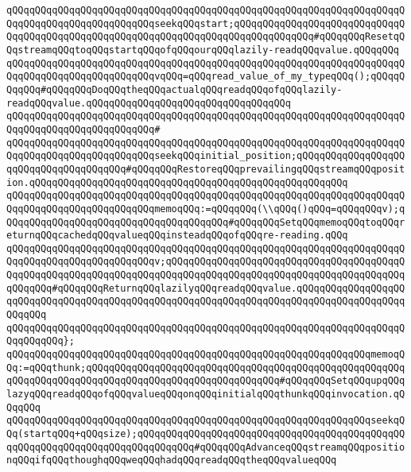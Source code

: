 \verb|qQQqqQQqqQQqqQQqqQQqqQQqqQQqqQQqqQQqqQQqqQQqqQQqqQQqqQQqqQQqqQQqqQQqqQQqqQQqqQQqqQQqqQQqqQQqqQQqseekqQQqstart;qQQqqQQqqQQqqQQqqQQqqQQqqQQqqQQqqQQqqQQqqQQqqQQqqQQqqQQqqQQqqQQqqQQqqQQqqQQqqQQqqQQq#qQQqqQQqResetqQQqstreamqQQqtoqQQqstartqQQqofqQQqourqQQqlazily-readqQQqvalue.qQQqqQQq|\newline
\verb|qQQqqQQqqQQqqQQqqQQqqQQqqQQqqQQqqQQqqQQqqQQqqQQqqQQqqQQqqQQqqQQqqQQqqQQqqQQqqQQqqQQqqQQqqQQqqQQqvqQQq=qQQqread_value_of_my_typeqQQq();qQQqqQQqqQQq#qQQqqQQqDoqQQqtheqQQqactualqQQqreadqQQqofqQQqlazily-readqQQqvalue.qQQqqQQqqQQqqQQqqQQqqQQqqQQqqQQqqQQq|\newline
\verb|qQQqqQQqqQQqqQQqqQQqqQQqqQQqqQQqqQQqqQQqqQQqqQQqqQQqqQQqqQQqqQQqqQQqqQQqqQQqqQQqqQQqqQQqqQQqqQQq#|\newline
\verb|qQQqqQQqqQQqqQQqqQQqqQQqqQQqqQQqqQQqqQQqqQQqqQQqqQQqqQQqqQQqqQQqqQQqqQQqqQQqqQQqqQQqqQQqqQQqqQQqseekqQQqinitial_position;qQQqqQQqqQQqqQQqqQQqqQQqqQQqqQQqqQQqqQQq#qQQqqQQqRestoreqQQqprevailingqQQqstreamqQQqposition.qQQqqQQqqQQqqQQqqQQqqQQqqQQqqQQqqQQqqQQqqQQqqQQqqQQqqQQq|\newline
\verb|qQQqqQQqqQQqqQQqqQQqqQQqqQQqqQQqqQQqqQQqqQQqqQQqqQQqqQQqqQQqqQQqqQQqqQQqqQQqqQQqqQQqqQQqqQQqqQQqmemoqQQq:=qQQqqQQq(\\qQQq()qQQq=qQQqqQQqv);qQQqqQQqqQQqqQQqqQQqqQQqqQQqqQQqqQQqqQQq#qQQqqQQqSetqQQqmemoqQQqtoqQQqreturnqQQqcachedqQQqvalueqQQqinsteadqQQqofqQQqre-reading.qQQq|\newline
\verb|qQQqqQQqqQQqqQQqqQQqqQQqqQQqqQQqqQQqqQQqqQQqqQQqqQQqqQQqqQQqqQQqqQQqqQQqqQQqqQQqqQQqqQQqqQQqqQQqv;qQQqqQQqqQQqqQQqqQQqqQQqqQQqqQQqqQQqqQQqqQQqqQQqqQQqqQQqqQQqqQQqqQQqqQQqqQQqqQQqqQQqqQQqqQQqqQQqqQQqqQQqqQQqqQQqqQQqqQQq#qQQqqQQqReturnqQQqlazilyqQQqreadqQQqvalue.qQQqqQQqqQQqqQQqqQQqqQQqqQQqqQQqqQQqqQQqqQQqqQQqqQQqqQQqqQQqqQQqqQQqqQQqqQQqqQQqqQQqqQQqqQQqqQQq|\newline
\verb|qQQqqQQqqQQqqQQqqQQqqQQqqQQqqQQqqQQqqQQqqQQqqQQqqQQqqQQqqQQqqQQqqQQqqQQqqQQqqQQq};|\newline
\newline
\verb|qQQqqQQqqQQqqQQqqQQqqQQqqQQqqQQqqQQqqQQqqQQqqQQqqQQqqQQqqQQqqQQqmemoqQQq:=qQQqthunk;qQQqqQQqqQQqqQQqqQQqqQQqqQQqqQQqqQQqqQQqqQQqqQQqqQQqqQQqqQQqqQQqqQQqqQQqqQQqqQQqqQQqqQQqqQQqqQQqqQQqqQQq#qQQqqQQqSetqQQqupqQQqlazyqQQqreadqQQqofqQQqvalueqQQqonqQQqinitialqQQqthunkqQQqinvocation.qQQqqQQq|\newline
\verb|qQQqqQQqqQQqqQQqqQQqqQQqqQQqqQQqqQQqqQQqqQQqqQQqqQQqqQQqqQQqqQQqseekqQQq(startqQQq+qQQqsize);qQQqqQQqqQQqqQQqqQQqqQQqqQQqqQQqqQQqqQQqqQQqqQQqqQQqqQQqqQQqqQQqqQQqqQQqqQQqqQQq#qQQqqQQqAdvanceqQQqstreamqQQqpositionqQQqifqQQqthoughqQQqweqQQqhadqQQqreadqQQqtheqQQqvalueqQQq|\newline
